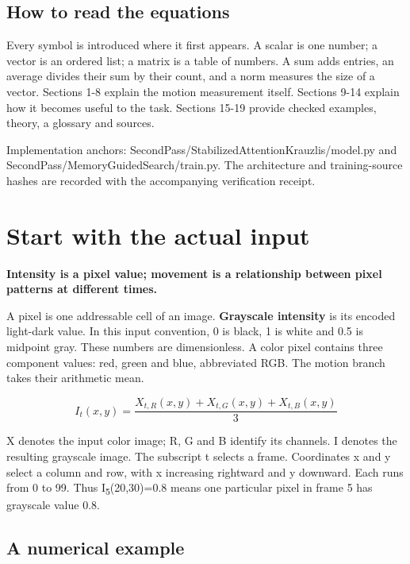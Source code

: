 \documentclass[11pt,letterpaper]{article}
\begin{document}
\subsection*{How to read the equations}

Every symbol is introduced where it first appears. A scalar is one number; a vector is an ordered list; a matrix is a table of numbers. A sum adds entries, an average divides their sum by their count, and a norm measures the size of a vector. Sections 1-8 explain the motion measurement itself. Sections 9-14 explain how it becomes useful to the task. Sections 15-19 provide checked examples, theory, a glossary and sources.


{
\small\color{muted} Implementation anchors: SecondPass/\allowbreak{}StabilizedAttentionKrauzlis/\allowbreak{}model.py and SecondPass/\allowbreak{}MemoryGuidedSearch/\allowbreak{}train.py. The architecture and training-source hashes are recorded with the accompanying verification receipt.\par}


\clearpage

\section{Start with the actual input}\label{sec1}

\textbf{Intensity is a pixel value; movement is a relationship between pixel patterns at different times.}


A pixel is one addressable cell of an image. \textbf{Grayscale intensity} is its encoded light-dark value. In this input convention, 0 is black, 1 is white and 0.5 is midpoint gray. These numbers are dimensionless. A color pixel contains three component values: red, green and blue, abbreviated RGB. The motion branch takes their arithmetic mean.


\begin{equation}I_t(x,y)=\frac{X_{t,R}(x,y)+X_{t,G}(x,y)+X_{t,B}(x,y)}{3}\end{equation}

X denotes the input color image; R, G and B identify its channels. I denotes the resulting grayscale image. The subscript t selects a frame. Coordinates x and y select a column and row, with x increasing rightward and y downward. Each runs from 0 to 99. Thus I\textsubscript{5}(20,30)=0.8 means one particular pixel in frame 5 has grayscale value 0.8.


\subsection*{A numerical example}
\end{document}
